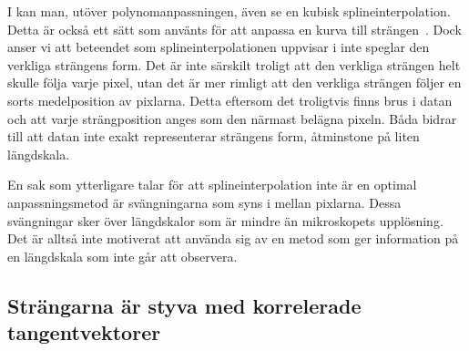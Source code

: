 I  kan man, utöver polynomanpassningen, även se en kubisk splineinterpolation. Detta är också ett sätt som använts för att anpassa en kurva till strängen~\cite{Koster_etal2005,Koster_etal2007}. Dock anser vi att beteendet som splineinterpolationen uppvisar i  inte speglar den verkliga strängens form. Det är inte särskilt troligt att den verkliga strängen helt skulle följa varje pixel, utan det är mer rimligt att den verkliga strängen följer en sorts medelposition av pixlarna. Detta eftersom det troligtvis finns brus i datan och att varje strängposition anges som den närmast belägna pixeln. Båda bidrar till att datan inte exakt representerar strängens form, åtminstone på liten längdskala.

En sak som ytterligare talar för att splineinterpolation inte är en optimal anpassningsmetod är svängningarna %
som syns i  mellan pixlarna. Dessa svängningar sker över längdskalor som är mindre än mikroskopets upplösning. Det är alltså inte motiverat att använda sig av en metod som ger information på en längdskala som inte går att observera. 







\subsection{Strängarna är styva med korrelerade tangentvektorer}

